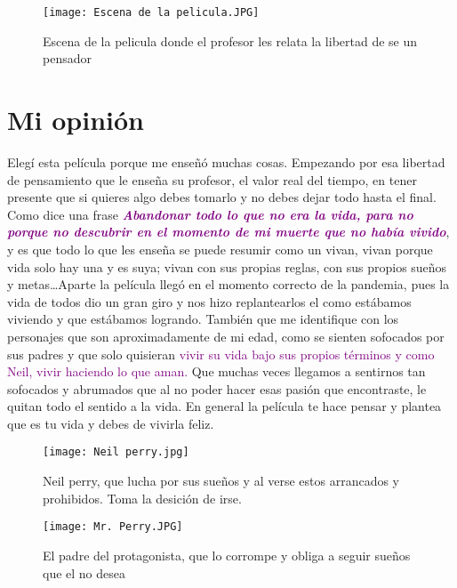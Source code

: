 \documentclass[a5 paper,11 pt]{article}
\begin{document}
{\begin{figure}
 \caption{Escena de la pelicula donde el profesor les relata la libertad de se un pensador}
   \raggedleft
    \texttt{[image: Escena de la pelicula.JPG]}
    
    
\end{figure}


\section{Mi opinión }
Elegí esta película porque me enseñó muchas cosas. Empezando por esa libertad de pensamiento que le enseña su profesor, el valor real del tiempo, en tener presente que si quieres algo debes tomarlo y no debes dejar todo hasta el final. Como dice una frase \textbf{\emph{\textcolor{purple}{Abandonar todo lo que no era la vida, para no porque no descubrir en el momento de mi muerte que no había vivido}}}, y es que todo lo que les enseña se puede resumir como un vivan, vivan porque vida solo hay una y es suya; vivan con sus propias reglas, con sus propios sueños y metas…Aparte la película llegó en el momento correcto de la pandemia, pues la vida de todos dio un gran giro y nos hizo replantearlos el como estábamos viviendo y que estábamos logrando. 
También que me identifique con los personajes que son aproximadamente de mi edad, como se sienten sofocados por sus padres y que solo quisieran \textcolor{purple}{vivir su vida bajo sus propios términos y como Neil, vivir haciendo lo que aman.} Que muchas veces llegamos a sentirnos tan sofocados y abrumados que al no poder hacer esas pasión que encontraste, le quitan todo el sentido a la vida. 
En general la película te hace pensar y plantea que es tu vida y debes de vivirla feliz. }


\begin{figure}

    \raggedleft
    \texttt{[image: Neil perry.jpg]} \caption{Neil perry, que lucha por sus sueños y al verse estos arrancados y prohibidos. Toma la desición de irse.}
               
    \end{figure}

\begin{figure}
 
   \raggedleft
    \texttt{[image: Mr. Perry.JPG]}
    \caption{El padre del protagonista, que lo corrompe y obliga a seguir sueños que el no desea}
    

\end{figure}



 
\end{document}
